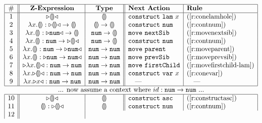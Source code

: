 \begin{figure*}[t!]
\[
\begin{array}{|c||c|c||l|l|}
\hline
\# & \textbf{Z-Expression} & 
\textbf{Type} & \textbf{Next Action} & \textbf{Rule}
\\
\hline
1 &
\zwsel{\hhole{}} & 
\tehole 
&
\aConstruct{\flam{x}} & 
\text{(\ref{r:conelamhole})}
\\ 2 &
\hlam{x}{\hhole{}} : \tarr{\zwsel{\hhole{}}}{\hhole{}} & 
\tarr{\tehole}{\tehole} &
\aConstruct{\fnum{}} &
\text{(\ref{r:contnum})}
\\ 3 &
\hlam{x}{\hhole{}} : \tarr{\zwsel{\tnum{}}}{\hhole{}} &
\tarr{\tnum}{\tehole} & 
\aMove{\dNext{}} & 
\text{({\ref{r:movenextsib}})}
\\ 4 &
\hlam{x}{\hhole{}} : \tarr{\tnum}{\zwsel{\hhole{}}}
&
\tarr{\tnum}{\tehole} & 
\aConstruct{\fnum{}} & 
\text{(\ref{r:contnum})}
\\ 5 &
\hlam{x}{\hhole{}} : \tarr{\tnum{}}{\zwsel{\tnum{}}} & 
\tarr{\tnum}{\tnum} &
\aMove{\dParent{}} & 
\text{(\ref{r:moveparent})}
\\ 6 &
\hlam{x}{\hhole{}} : \zwsel{\tarr{\tnum{}}{\tnum{}}}
&
\tarr{\tnum}{\tnum} & 
\aMove{\dPrev{}} & 
\text{(\ref{r:moveprevsib})}
\\ 7 &
\zwsel{\hlam{x}{\hhole{}}} : \tarr{\tnum{}}{\tnum{}} & 
\tarr{\tnum}{\tnum} &
\aMove{\dChild{}} & 
\text{(\ref{r:movefirstchild-lam})}
\\ 8 &
\hlam{x}{\zwsel{\hhole{}}} : \tarr{\tnum{}}{\tnum{}} &
\tarr{\tnum}{\tnum} & 
\aConstruct{\fvar{x}} & 
\text{(\ref{r:conevar})}
\\ 9 &
\hlam{x}{\zwsel{{x}}} : \tarr{\tnum{}}{\tnum{}} &
\tarr{\tnum}{\tnum} & 
\quad\textrm{---}
&
\quad\textrm{---}
\\
\hline
\multicolumn{5}{c}{\text{... now assume a context where $id : \tarr{\tnum}{\tnum}$ ...}}\\
\hline
10 &
\zwsel{\hhole{}} & 
\tehole &
\aConstruct{\fasc} & 
\text{(\ref{r:constructasc})}
\\
11 &
\hhole{} : \zwsel{ \hhole{}} &
\tehole & 
\aConstruct{\fnum{}} & 
\text{(\ref{r:contnum})}
\\
12 &

\end{array}\]
\end{figure*}
